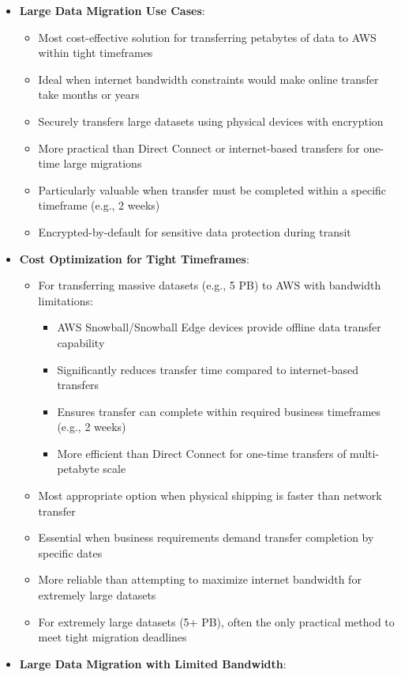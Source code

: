 \documentclass[11pt,a4paper]{report}
\begin{document}
\begin{itemize}
  \item \textbf{Large Data Migration Use Cases}:
\begin{itemize}
  \item Most cost-effective solution for transferring petabytes of data to AWS within tight timeframes
  \item Ideal when internet bandwidth constraints would make online transfer take months or years
  \item Securely transfers large datasets using physical devices with encryption
  \item More practical than Direct Connect or internet-based transfers for one-time large migrations
  \item Particularly valuable when transfer must be completed within a specific timeframe (e.g., 2 weeks)
  \item Encrypted-by-default for sensitive data protection during transit
\end{itemize}
  \item \textbf{Cost Optimization for Tight Timeframes}:
\begin{itemize}
  \item For transferring massive datasets (e.g., 5 PB) to AWS with bandwidth limitations:
\begin{itemize}
  \item AWS Snowball/Snowball Edge devices provide offline data transfer capability
  \item Significantly reduces transfer time compared to internet-based transfers
  \item Ensures transfer can complete within required business timeframes (e.g., 2 weeks)
  \item More efficient than Direct Connect for one-time transfers of multi-petabyte scale
\end{itemize}
  \item Most appropriate option when physical shipping is faster than network transfer
  \item Essential when business requirements demand transfer completion by specific dates
  \item More reliable than attempting to maximize internet bandwidth for extremely large datasets
  \item For extremely large datasets (5+ PB), often the only practical method to meet tight migration deadlines
\end{itemize}
  \item \textbf{Large Data Migration with Limited Bandwidth}:

\end{itemize}
\end{document}
